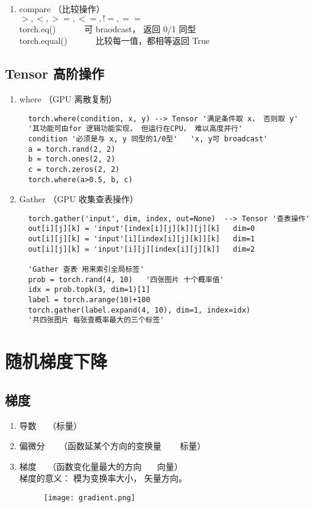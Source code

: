 \begin{enumerate}
  \item compare （比较操作）\\
  $>, <, >=, <=, !=, ==$\\
  torch.eq()   ~~~~~~可 braodcast， 返回 0/1 同型\\
  torch.equal()   ~~~~~~比较每一值，都相等返回 True
\end{enumerate}


\subsection{Tensor 高阶操作}
\begin{enumerate}
  \item where  （GPU 离散复制）
  \begin{lstlisting}
  torch.where(condition, x, y) --> Tensor '满足条件取 x， 否则取 y'
  '其功能可由for 逻辑功能实现， 但运行在CPU， 难以高度并行'
  condition '必须是与 x, y 同型的1/0型'   'x, y可 broadcast'
  a = torch.rand(2, 2)
  b = torch.ones(2, 2)
  c = torch.zeros(2, 2)
  torch.where(a>0.5, b, c)
  \end{lstlisting}
  \item Gather  （GPU 收集查表操作）
  \begin{lstlisting}
  torch.gather('input', dim, index, out=None)  --> Tensor '查表操作'
  out[i][j][k] = 'input'[index[i][j][k]][j][k]   dim=0
  out[i][j][k] = 'input'[i][index[i][j][k]][k]   dim=1
  out[i][j][k] = 'input'[i][j][index[i][j][k]]   dim=2

  'Gather 查表 用来索引全局标签'
  prob = torch.rand(4, 10)   '四张图片 十个概率值'
  idx = prob.topk(3, dim=1)[1]
  label = torch.arange(10)+100
  torch.gather(label.expand(4, 10), dim=1, index=idx)
  '共四张图片 每张查概率最大的三个标签'
  \end{lstlisting}
\end{enumerate}

\section{随机梯度下降}
\subsection{梯度}
\begin{enumerate}
  \item 导数 ~~（标量）
  \item 偏微分  ~~ （函数延某个方向的变换量 ~~~ 标量）
  \item 梯度~~  （函数变化量最大的方向  ~~~向量）\\
  梯度的意义： 模为变换率大小， 矢量方向。
\begin{figure}[!h]
  \centering
  \texttt{[image: gradient.png]}
\end{figure}
\end{enumerate}

